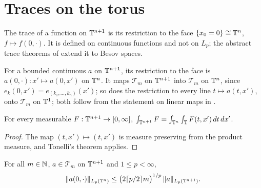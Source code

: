 \section{Traces on the torus}
\label{sec:torus-traces}

The trace of a function on $\mathbb{T}^{n+1}$ is its restriction to the face $\{x_0 = 0\} \cong \mathbb{T}^n$,
$f \mapsto f(0, \cdot)$. It is defined on continuous functions and not on $L_p$; the abstract
trace theorems of  extend it to Besov spaces.

\begin{definition}
\label{def:face-restriction}
\leanok
{}
For a bounded continuous $a$ on $\mathbb{T}^{n+1}$, its restriction to the face is
$a(0, \cdot) : x' \mapsto a(0, x')$ on $\mathbb{T}^n$. It maps $\mathcal{T}_m$ on $\mathbb{T}^{n+1}$ into
$\mathcal{T}_m$ on $\mathbb{T}^n$, since $e_k(0, x') = e_{(k_1, \dots, k_n)}(x')$; so does the
restriction to every line $t \mapsto a(t, x')$, onto $\mathcal{T}_m$ on $\mathbb{T}^1$; both follow
from the statement on linear maps in .
\end{definition}

\begin{lemma}[Fubini on $\T^{n+1} = \T \times \T^n$]
\label{lem:fubini-cons}
\leanok
For every measurable $F : \mathbb{T}^{n+1} \to [0, \infty]$,
$\int_{\mathbb{T}^{n+1}} F = \int_{\mathbb{T}^n} \int_{\mathbb{T}} F(t, x') \, dt \, dx'$.
\end{lemma}

\begin{proof}
\leanok
The map $(t, x') \mapsto (t, x')$ is measure preserving from the product measure, and Tonelli's
theorem applies.
\end{proof}

\begin{theorem}
\label{thm:trace-inequality-torus}
\leanok
{}
For all $m \in \mathbb{N}$, $a \in \mathcal{T}_m$ on $\mathbb{T}^{n+1}$ and $1 \leq p < \infty$,
\[
  \|a(0, \cdot)\|_{L_p(\mathbb{T}^n)} \leq \bigl(2 \lceil p/2 \rceil m\bigr)^{1/p} \,
  \|a\|_{L_p(\mathbb{T}^{n+1})} .
\]
\end{theorem}

